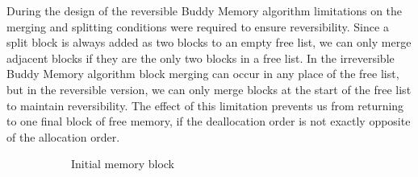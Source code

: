 During the design of the reversible Buddy Memory algorithm limitations on the merging and splitting conditions were required to ensure reversibility. Since a split block is always added as two blocks to an empty free list, we can only merge adjacent blocks if they are the only two blocks in a free list. In the irreversible Buddy Memory algorithm block merging can occur in any place of the free list, but in the reversible version, we can only merge blocks at the start of the free list to maintain reversibility. The effect of this limitation prevents us from returning to one final block of free memory, if the deallocation order is not exactly opposite of the allocation order.

\begin{figure}[ht]
    \centering
    \begin{subfigure}[t]{.5\textwidth}
        \centering
        \caption{\footnotesize Initial memory block}
    \end{subfigure}%
    \begin{subfigure}[t]{.5\textwidth}
        \centering
\end{subfigure}
\end{figure}
